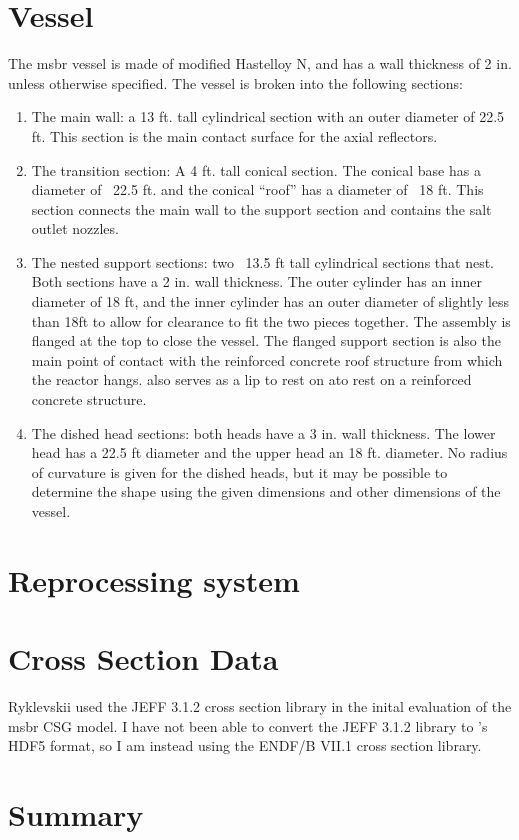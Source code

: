 \section{Vessel}
\label{sec:msbr-vessel}
The \Gls{msbr} vessel is made of modified Hastelloy N, and has a wall thickness
of 2 in. unless otherwise specified\cite{robertson_conceptual_1971}. The vessel
is broken into the following sections:
\begin{enumerate}
    \item The main wall: a 13 ft. tall cylindrical section with an outer
    diameter of 22.5 ft. This section is the main contact surface for the axial
    reflectors.
    \item The transition section: A 4 ft. tall conical section. The conical base
    has a diameter of ~22.5 ft. and the conical ``roof'' has a diameter of ~18
    ft. This section connects the main wall to the support section and contains
    the salt outlet nozzles.
    \item The nested support sections: two ~13.5 ft tall cylindrical sections
    that nest. Both sections have a 2 in. wall thickness. The outer cylinder has
    an inner diameter of 18 ft, and the inner cylinder has an outer diameter of
    slightly less than 18ft to allow for clearance to fit the two pieces
    together. The assembly is flanged at the top to close the vessel. The
    flanged support section is also the main point of contact with the
    reinforced concrete roof structure from which the reactor hangs. also serves
    as a lip to rest on ato rest on a reinforced concrete structure.
    \item The dished head sections: both heads have a 3 in. wall thickness. The
    lower head has a 22.5 ft diameter and the upper head an 18 ft. diameter. No
    radius of curvature is given for the dished heads, but it may be possible to
    determine the shape using the given dimensions and other dimensions of the
    vessel.
\end{enumerate}

\section{Reprocessing system}
\label{sec:msbr-reprocessing-system}

\section{Cross Section Data}
Ryklevskii used the JEFF 3.1.2 cross section library in the inital evaluation of the \Gls{msbr} CSG model. I have not been able to convert the JEFF 3.1.2 library to \OpenMC's HDF5 format, so I am instead using the ENDF/B VII.1 cross section library.

\section{Summary}
